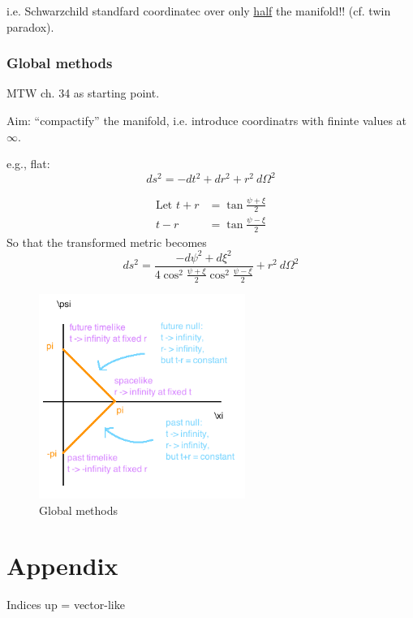 \documentclass[a4paper]{article} %
\begin{document}
i.e. Schwarzchild standfard coordinatec over only \underline{half} the manifold!! (cf. twin paradox).

\section{Global methods}
MTW ch. 34 as starting point.

Aim: ``compactify'' the manifold, i.e. introduce coordinatrs with fininte values at $\infty$.

e.g., flat: 
\begin{equation}
ds^2 = -dt^2 + dr^2 + r^2~d\Omega^2
\end{equation}

\begin{align}
\text{Let } t+r&=\tan\frac{\psi+\xi}{2}\\
t-r&= \tan \frac{\psi-\xi}{2}
\end{align}
So that the transformed metric becomes
\begin{equation}
ds^2=\frac{-d\psi^2 + d\xi^2}{4\cos^2\frac{\psi+\xi}{2}\cos^2\frac{\psi-\xi}{2}}+r^2~d\Omega^2
\end{equation}

\begin{figure}[h]
\centering
\includegraphics[width=0.6\textwidth]{images/global-methods.png}
\caption{Global methods}
\end{figure}


\pagebreak
\part{Appendix}


Indices up = vector-like
\end{document}
